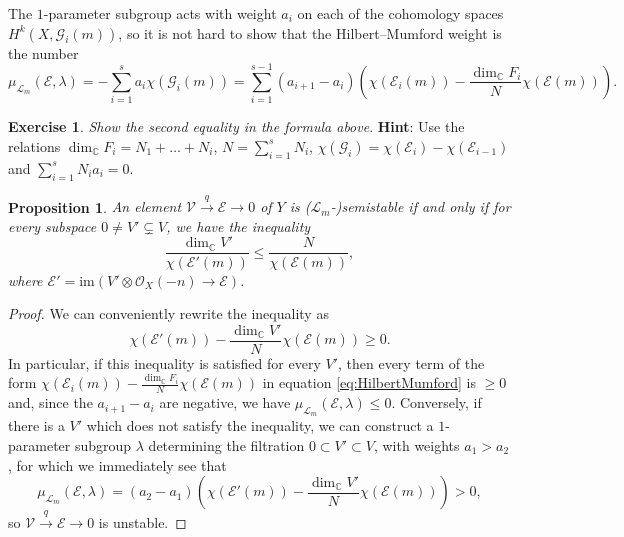 \documentclass[12pt,a4paper]{amsbook}
\newtheorem{prop}[thm]{Proposition}
\theoremstyle{remark} \newtheorem{rmk}[thm]{Remark}
\theoremstyle{definition} \newtheorem{defn}[thm]{Definition}
\theoremstyle{definition} \newtheorem{ex}[thm]{Example}
\theoremstyle{definition} \newtheorem{ej}{Exercise}
\newcommand{\C}{\mathbb C}
\newcommand{\sO}{\mathscr O}
\newcommand{\sE}{\mathscr E}
\newcommand{\sL}{\mathscr L}
\newcommand{\sG}{\mathscr G}
\newcommand{\sV}{\mathscr V}
\begin{document}
The $1$-parameter subgroup acts with weight $a_i$ on each of the cohomology spaces $H^k(X,\sG_{i}(m))$, so it is not hard to show that the Hilbert--Mumford weight is the number
\begin{equation} \label{eq:HilbertMumford}
\mu_{\sL_m}(\sE,\lambda) = -\sum_{i=1}^s a_i \chi(\sG_{i}(m)) = \sum_{i=1}^{s-1}(a_{i+1}-a_i) \left(\chi(\sE_i(m)) - \frac{\dim_\C F_i}{N} \chi(\sE(m))\right).
\end{equation}

\begin{ej}
\textit{Show the second equality in the formula above}. \textbf{Hint}: Use the relations $\dim_\C F_i = N_1 + \dots + N_i$, $N=\sum_{i=1}^sN_i$, $\chi(\sG_i)=\chi(\sE_i)-\chi(\sE_{i-1})$ and $\sum_{i=1}^s N_i a_i = 0$.
\end{ej}

\begin{prop}
  An element $\sV \overset{q}{\rightarrow} \sE \rightarrow 0$ of $Y$ is ($\sL_m$-)semistable if and only if for every subspace $0\neq V' \subsetneq V$, we have the inequality
  \begin{equation*}
\frac{\dim_\C V'}{\chi(\sE'(m))} \leq \frac{N}{\chi(\sE(m))},
  \end{equation*}
  where $\sE'=\mathrm{im}(V' \otimes \sO_X(-n)\rightarrow \sE)$.
\end{prop}

\begin{proof}
We can conveniently rewrite the inequality as
  \begin{equation*}
\chi(\sE'(m))-\frac{\dim_\C V'}{N}\chi(\sE(m)) \geq 0.
  \end{equation*}
  In particular, if this inequality is satisfied for every $V'$, then every term of the form $\chi(\sE_i(m)) - \frac{\dim_\C F_i}{N} \chi(\sE(m))$ in equation \eqref{eq:HilbertMumford} is $\geq 0$ and, since the $a_{i+1}-a_i$ are negative, we have $\mu_{\sL_m}(\sE,\lambda)\leq 0$. Conversely, if there is a $V'$ which does not satisfy the inequality, we can construct a $1$-parameter subgroup $\lambda$ determining the filtration $0\subset V' \subset V$, with weights $a_1>a_2$, for which we immediately see that
\begin{equation*}
\mu_{\sL_m}(\sE,\lambda) = (a_{2}-a_1) \left(\chi(\sE'(m)) - \frac{\dim_\C V'}{N} \chi(\sE(m))\right) > 0,
\end{equation*}
so $\sV \overset{q}{\rightarrow} \sE \rightarrow 0$ is unstable.
\end{proof}
\end{document}
